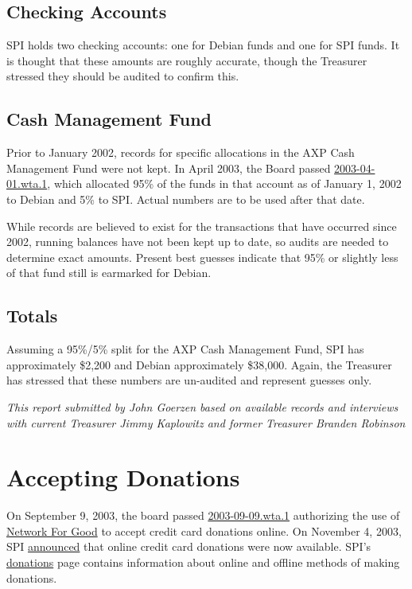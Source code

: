 \documentclass[letterpaper]{report}
\begin{document}
\subsection{Checking Accounts}

SPI holds two checking accounts: one for Debian funds and one for
SPI funds. It is thought that these amounts are roughly accurate,
though the Treasurer stressed they should be audited to confirm this.


\subsection{Cash Management Fund}

Prior to January 2002, records for specific allocations in the AXP
Cash Management Fund were not kept. In April 2003, the Board passed
\href{https://www.spi-inc.org/corporate/resolutions/2003/2003-04-01.wta.1}{2003-04-01.wta.1},
which allocated 95\% of the funds in that account as of January 1,
2002 to Debian and 5\% to SPI. Actual numbers are to be used after
that date.

While records are believed to exist for the transactions that have
occurred since 2002, running balances have not been kept up to date,
so audits are needed to determine exact amounts. Present best guesses
indicate that 95\% or slightly less of that fund still is earmarked
for Debian.


\subsection{Totals}

Assuming a 95\%/5\% split for the AXP Cash Management Fund, SPI has
approximately \$2,200 and Debian approximately \$38,000. Again, the
Treasurer has stressed that these numbers are un-audited and represent
guesses only.

\emph{This report submitted by John Goerzen based on available records
and interviews with current Treasurer Jimmy Kaplowitz and former Treasurer
Branden Robinson}


\section{Accepting Donations}

On September 9, 2003, the board passed \href{https://www.spi-inc.org/corporate/resolutions/2003/2003-09-09.wta.1}{2003-09-09.wta.1}
authorizing the use of \href{http://www.networkforgood.org/}{Network For Good}
to accept credit card donations online. On November 4, 2003, SPI \href{https://www.spi-inc.org/news/2003/20031104}{announced}
that online credit card donations were now available. SPI's \href{https://www.spi-inc.org/donations}{donations}
page contains information about online and offline methods of making
donations.
\end{document}

